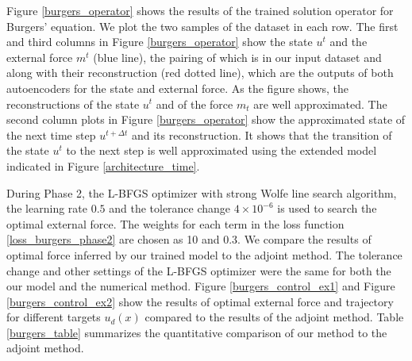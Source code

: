 \documentclass[letterpaper]{article}
\begin{document}
Figure \ref{burgers_operator} shows the results of the trained solution operator for Burgers' equation. We plot the two samples of the dataset in each row. The first and third columns in Figure \ref{burgers_operator} show the state $u^t$ and the external force $m^t$ (blue line), the pairing of which is in our input dataset and along with their reconstruction (red dotted line), which are the outputs of both autoencoders for the state and external force. As the figure shows, the reconstructions of the state $u^t$ and of the force $m_t$ are well approximated. The second column plots in Figure \ref{burgers_operator} show the approximated state of the next time step $u^{t+\Delta t}$ and its reconstruction. It shows that the transition of the state $u^t$ to the next step is well approximated using the extended model indicated in Figure \ref{architecture_time}.

During Phase 2, the L-BFGS optimizer with strong Wolfe line search algorithm, the learning rate $0.5$ and the tolerance change $4\times10^{-6}$ is used to search the optimal external force. The weights for each term in the loss function \eqref{loss_burgers_phase2} are chosen as 10 and 0.3. We compare the results of optimal force inferred by our trained model to the adjoint method. The tolerance change and other settings of the L-BFGS optimizer were the same for both the our model and the numerical method. Figure \ref{burgers_control_ex1} and Figure \ref{burgers_control_ex2} show the results of optimal external force and trajectory for different targets $u_d(x)$ compared to the results of the adjoint method. Table \ref{burgers_table} summarizes the quantitative comparison of our method to the adjoint method. 
\end{document}
